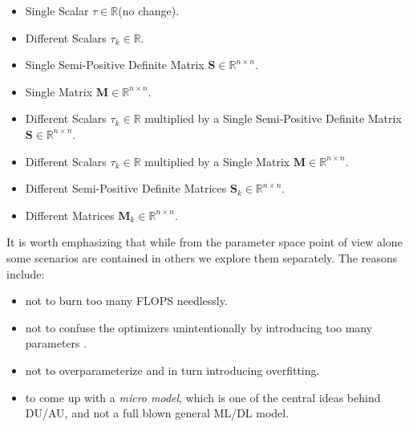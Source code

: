 \begin{itemize}
  \item Single Scalar $\tau \in \mathbb{R}$(no change).
  \item Different Scalars $\tau_k\in\mathbb{R}$.
  \item Single Semi-Positive Definite Matrix $\boldsymbol{S}\in \mathbb{R}^{n\times n}$.
  \item Single Matrix $\boldsymbol{M}\in \mathbb{R}^{n\times n}$.
  \item Different Scalars $\tau_k \in \mathbb{R}$ multiplied by a Single Semi-Positive Definite Matrix $\boldsymbol{S} \in \mathbb{R}^{n\times n}$.
  \item Different Scalars $\tau_k \in \mathbb{R}$ multiplied by a Single Matrix $\boldsymbol{M} \in \mathbb{R}^{n\times n}$.
  \item Different Semi-Positive Definite Matrices $\boldsymbol{S}_k\in \mathbb{R}^{n\times n}$.
  \item Different Matrices $\boldsymbol{M}_k\in \mathbb{R}^{n\times n}$.
\end{itemize}

\noindent It is worth emphasizing that while from the parameter space point of view alone some scenarios are contained in others we explore them separately. 
The reasons include:
\begin{itemize}
  \item not to burn too many \ac{FLOPS}\cite{Hager2010}\cite{Hennessy2019} needlessly.
  \item not to confuse the optimizers unintentionally by introducing too many parameters \cite{Sun2019}.
  \item not to overparameterize and in turn introducing overfitting\cite{Bishop2006}\cite{Goodfellow2016}\cite{ShalevShwartz2014}.
  \item to come up with a \emph{micro model}, which is one of the central ideas behind \ac{DU}/\ac{AU}\cite{Shechtman2015}, and not a full blown general \ac{ML}/\ac{DL} model.
\end{itemize}

